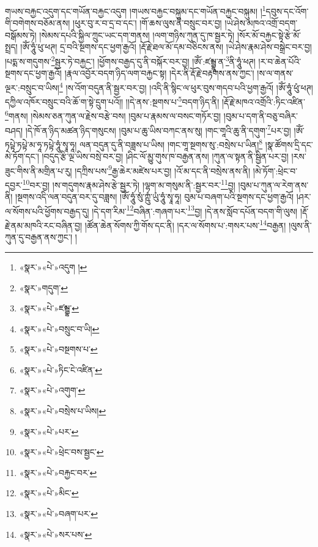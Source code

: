 གཡས་བརྐྱང་འདུག་དང་གཡོན་བརྐྱང་འདུག །གཡས་བརྐྱང་བསྐུམ་དང་གཡོན་བརྐྱང་བསྐུམ། །\footnote{«སྣར་»«པེ་»འདུག །}དབུས་དང་འོག་གི་བགེགས་བཅོམ་ནས། །ཕུར་བུ་ར་བ་དྲ་བ་དང་། །གོ་ཆས་ལུས་ནི་བསྲུང་བར་བྱ། །ཡེ་ཤེས་མཁའ་འགྲོ་བདག་བསྒོམས་ཏེ། །སེམས་དཔའི་སྐྱིལ་ཀྲུང་ཡང་དག་གནས། །ལག་གཉིས་ཀུན་དུ་ཁ་སྦྱར་ཏེ། །སོར་མོ་བརྐྱང་སྟེ་རྩེ་མོ་སྤྲད། །ཨོཾ་ཧཱུཾ་ཕུ་ཕཊ། དྲ་བའི་སྔགས་དང་ཕྱག་རྒྱའོ། །རྡོ་རྗེ་ཐལ་མོ་དམ་བཅིངས་ནས། །ཡེ་ཤེས་རྣམ་ཤེས་བསྒྲེང་བར་བྱ། །པདྨ་ས་གདུགས་\footnote{«སྣར་»གདུག་}སྦྱར་ཏེ་བརྐྱང་། །ཕྱོགས་བརྒྱད་དུ་ནི་བསྐོར་བར་བྱ། །ཨོཾ་:ཛམྦྷཱ་ན་\footnote{«སྣར་»«པེ་»ཛམྦྷ་}ནི་ཧཱུཾ་ཕཊ། །ར་བ་ཆེན་པོའི་སྔགས་དང་ཕྱག་རྒྱའོ། །རྣལ་འབྱོར་བདག་ཉིད་ལག་བརྐྱང་སྟ། །དེར་ནི་རྡོ་རྗེ་བརྟགས་ནས་ཀྱང་། །ས་ལ་གནས་ལྔར་:བསྲུང་བ་ཡིས།\footnote{«སྣར་»«པེ་»བསྲུང་བ་ཡི།} །ས་འོག་བདུན་ནི་སྦྱར་བར་བྱ། །འདི་ནི་སྙིང་ལ་ཕུར་བུས་གདབ་པའི་ཕྱག་རྒྱའོ། །ཨོཾ་ཧཱུཾ་ཕུཾ་ཕཊ། དཀྱིལ་འཁོར་བསྲུང་བའི་ཆོ་ག་སྟེ་དྲུག་པའོ།། །།དེ་ནས་:སྔགས་པ་\footnote{«སྣར་»«པེ་»བསྔགས་པ་}བདག་ཉིད་ནི། །རྡོ་རྗེ་མཁའ་འགྲོའི་:ཏིང་འཛིན་\footnote{«སྣར་»«པེ་»ཏིང་ངེ་འཛིན་}གནས། །སེམས་ཅན་ཀུན་ལ་རྗེས་བརྩེ་བས། །བུམ་པ་རྣམས་ལ་བསང་གཏོར་བྱ། །བུམ་པ་དག་ནི་བཅུ་བཞིར་བཤད། །དེ་ཁོ་ན་ཉིད་མཚན་ཉིད་གསུངས། །བུམ་པ་ཆུ་ཡིས་བཀང་ནས་སུ། །གང་གཱའི་ཆུ་ནི་དགུག་\footnote{«སྣར་»«པེ་»འགུག་}པར་བྱ། །ཨོཾ་ཏཔྟེ་ཏཔྟེ་མ་ཧཱ་ཏཔྟེ་ཧཱུཾ་སྭཱ་ཧཱ། ལན་བདུན་དུ་ནི་བཟླས་པ་ཡིས། །གང་གཱ་སྔགས་སུ་:བསྲེས་པ་ཡིན།\footnote{«སྣར་»«པེ་»བསྲེས་པ་ཡིས།} །སྣ་ཚོགས་དྲི་དང་མེ་ཏོག་དང་། །བདུད་རྩི་ལྔ་ཡིས་བསྲེ་བར་བྱ། །ཤིང་ལོ་མྱུ་གུས་ཁ་བརྒྱན་ནས། །ཀུན་ལ་སྟན་ནི་སྦྱིན་པར་བྱ། །རས་ཟུང་གིས་ནི་མགྲིན་པ་རུ། །དཀྲིས་པས་\footnote{«སྣར་»«པེ་»པར་}རྒྱ་ཆེར་མཛེས་པར་བྱ། །འོ་མ་དང་ནི་བསྲེས་ནས་ནི། །མེ་ཏོག་:ཕྲེང་བ་དབྱར་\footnote{«སྣར་»«པེ་»ཕྲེང་བས་སྦྱང་}བར་བྱ། །ས་གདུགས་རྣམ་ཤེས་རྩེ་སྦྱར་ཏེ། །ལྷག་མ་གསུམ་ནི་:སྦྱར་བར་\footnote{«སྣར་»«པེ་»བརྐྱང་བར་}བྱ། །བུམ་པ་ཀུན་ལ་རེག་ནས་ནི། །སྔགས་འདི་ལན་བདུན་བར་དུ་བཟླས། །ཨོཾ་ཧཱུཾ་སུཾ་ཀྵུཾ་ཡུཾ་ཧཱུཾ་སྭཱ་ཧཱ། བུམ་པ་བཞག་པའི་སྔགས་དང་ཕྱག་རྒྱའོ། །ཤར་ལ་སོགས་པའི་ཕྱོགས་བརྒྱད་དུ། །དེ་དག་རིམ་\footnote{«སྣར་»«པེ་»མིང་}བཞིན་:གཞག་པར་\footnote{«སྣར་»«པེ་»བཞག་པར་}བྱ། །དེ་ནས་སློབ་དཔོན་བདག་གི་ལུས། །རྡོ་རྗེ་ནམ་མཁའི་རང་བཞིན་བྱ། །ཚོན་ཆེན་སོགས་ཀྱི་གོས་དང་ནི། །དར་ལ་སོགས་པ་:གསར་པས་\footnote{«སྣར་»«པེ་»སར་པས་}བརྒྱན། །ལུས་ནི་ཀུན་དུ་བརྒྱན་ནས་ཀྱང་། །
